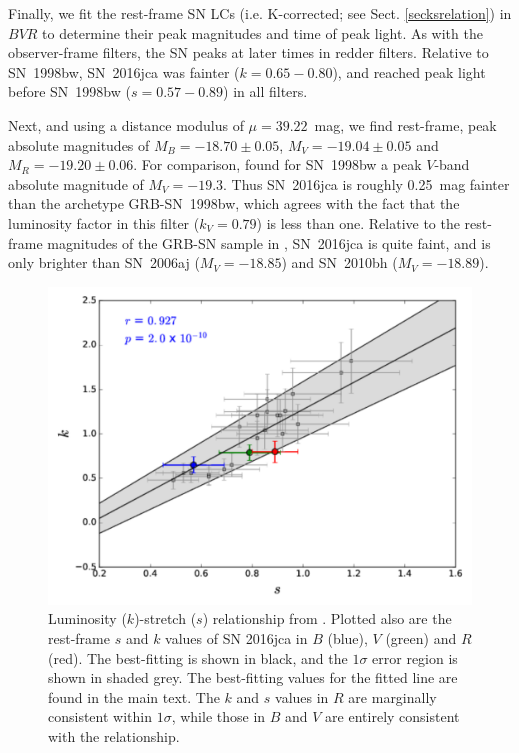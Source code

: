 \documentclass[traditabstract,longauth]{aa}
\begin{document}
Finally, we fit the rest-frame SN LCs (i.e. K-corrected; see Sect. \ref{secksrelation}) in $BVR$ to determine their peak magnitudes and time of peak light.  As with the observer-frame filters, the SN peaks at later times in redder filters.  Relative to SN~1998bw, SN~2016jca was fainter ($k=0.65-0.80$), and reached peak light before SN~1998bw ($s=0.57-0.89$) in all filters.

Next, and using a distance modulus of $\mu = 39.22$~mag, we find rest-frame, peak absolute magnitudes of $M_{B} = -18.70\pm0.05$, $M_{V} = -19.04\pm0.05$ and $M_{R} = -19.20\pm0.06$.  For comparison, \citet{LiHjorth2014} found for SN~1998bw a peak $V$-band absolute magnitude of $M_{V}=-19.3$.  Thus SN~2016jca is roughly 0.25~mag fainter than the archetype GRB-SN~1998bw, which agrees with the fact that the luminosity factor in this filter ($k_{V} = 0.79$) is less than one.  Relative to the rest-frame magnitudes of the GRB-SN sample in \citet{LiHjorth2014}, SN~2016jca is quite faint, and is only brighter than SN~2006aj ($M_{V} = -18.85$) and SN~2010bh ($M_{V} = -18.89$).



   
\begin{figure}
   \includegraphics[width=\columnwidth]{Fig10_2016jca_ks-eps-converted-to.pdf}
      \caption{Luminosity ($k$)-stretch ($s$) relationship from \citet{Cano14}.  Plotted also are the rest-frame $s$ and $k$ values of SN 2016jca in $B$ (blue), $V$ (green) and $R$ (red).  The best-fitting is shown in black, and the $1\sigma$ error region is shown in shaded grey.  The best-fitting values for the fitted line are found in the main text. The $k$ and $s$ values in $R$ are marginally consistent within $1\sigma$, while those in $B$ and $V$ are entirely consistent with the relationship. }
   \label{Figks}
\end{figure}
\end{document}
